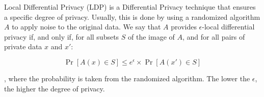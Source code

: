 Local Differential Privacy (LDP) is a Differential Privacy technique that ensures a specific degree of privacy. Usually, this is done by using a randomized algorithm $A$ to apply noise to the original data. We say that $A$ provides $\epsilon$-local differential privacy if, and only if, for all subsets $S$ of the image of $A$, and for all pairs of private data $x$ and $x'$:

\begin{equation}
    \label{eq:e-ldp}
    \Pr[A(x) \in S] \leq e^\epsilon \times \Pr[A(x') \in S]
\end{equation}

, where the probability is taken from the randomized algorithm. The lower the $\epsilon$, the higher the degree of privacy.
